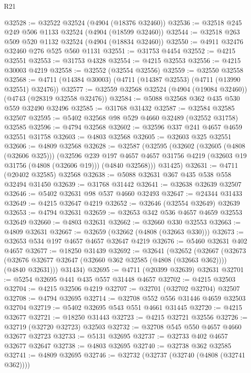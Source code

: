 \begin{lexlean}{R21}
\begin{coremodule}
@32528 := @32522 @32524 (@4904 (@18376 @32460))
@32536 := @32518 @245 @249 @506 @1133 @32524 (@4904 (@18599 @32460))
@32544 := @32518 @263 @509 @520 @1132 @32524 (@4904 (@18834 @32460))
@32550 := @4911 @32476 @32460 @276 @525 @560 @1131
@32551 := @31753 @4454
@32552 := @4215 @32551
@32553 := @31753 @4328
@32554 := @4215 @32553
@32556 := @4215 @30003 @4219
@32558 := @32552 (@32554 @32556)
@32559 := @32550 @32558
@32568 := @4711 (@14384 @30003) (@4711 (@14387 @32553) (@4711 (@13990 @32551) @32476))
@32577 := @32559 @32568 @32524 (@4904 (@19084 @32460)) (@4743 (@28319 @32558 @32476))
@32584 := @5088 @32568 @362 @435 @530 @559 @32490 @32496
@32585 := @31768 @31432
@32587 := @32584 @32585 @32507
@32595 := @5402 @32568 @98 @529 @4660 @32489 (@32552 @31758) @32585
@32596 := @4794 @32568
@32602 := @32596 @337 @241 @4657 @4659 @32551 @31758
@32603 := @4803 @32568
@32605 := @32603 @325 @32551
@32606 := @4809 @32568
@32628 := @32587
    (@32595
      (@32602
        (@32605 (@4808 (@32606 @325)))
        (@32596
          @239
          @197
          @4657
          @4657
          @31756
          @4219
          (@32603 @19 @31756 (@4808 (@32606 @19)))
          (@4840 @32568)))
      @31425)
@32631 := @4711 (@20402 @32585) @32568
@32638 := @5088 @32631 @367 @435 @538 @558 @32494 @31450
@32639 := @31768 @31442
@32641 := @32638 @32639 @32507
@32646 := @5402 @32631 @98 @537 @4660 @32493
@32647 := @24344 @31433
@32649 := @4215 @32647 @4219
@32652 := @32646 (@32554 @32649) @32639
@32653 := @4794 @32631
@32659 := @32653 @342 @536 @4657 @4659 @32553 @32649
@32660 := @4803 @32631
@32662 := @32660 @330 @32553
@32663 := @4809 @32631
@32667 := @32659 (@32662 (@4808 (@32663 @330)))
@32673 := @32653 @534 @197 @4657 @4657 @32647 @4219
@32676 := @5460 @32631 @402 @4657
@32677 := @18250 @31439
@32692 := @32641
    (@32652
      (@32667
        (@32673 (@32676 @32677 @32647 (@32660 @362 @32585 (@4808 (@32663 @362)))) (@4840 @32631)))
      @31434)
@32695 := @4711 (@20399 @32639) @32631
@32701 := @5254 @32695 @441 @435 @557 @31448 @4657
@32702 := @4215 @32503
@32704 := @4215 @32506 @4219
@32707 := @32701 (@32702 @32704) @32507
@32708 := @4794 @32695
@32714 := @32708 @552 @556 @31446 @4659 @32503 @32704
@32719 := @5402 @32695 @543 @551 @4661 @31445
@32720 := @4215 @32677
@32721 := @18250 @31443
@32723 := @4215 @32721 @32556
@32726 := @32719 (@32720 @32723) @32503
@32732 := @32708 @545 @550 @4657 @4660 @32677 @32723
@32733 := @5131 @32695
@32737 := @32733 @402 @4657 @32677 @32647
@32738 := @4803 @32695
@32740 := @32738 @362 @32585
@32741 := @4809 @32695
@32746 := @32732 (@32737 (@32740 (@4808 (@32741 @362))))

\end{coremodule}
\end{lexlean}
